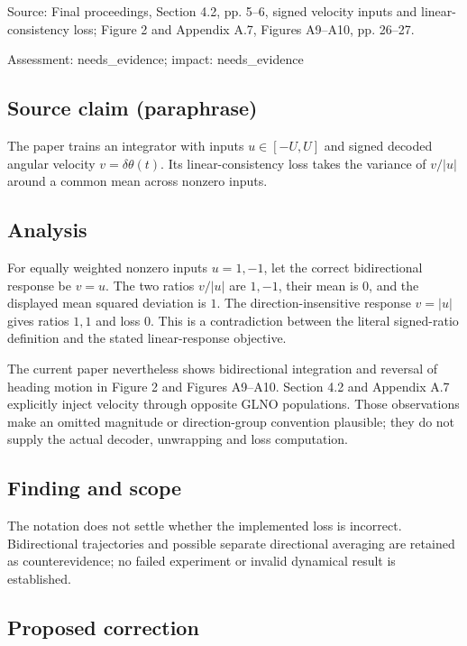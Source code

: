 \documentclass[11pt]{article}
\begin{document}
Source: Final proceedings, Section 4.2, pp. 5–6, signed velocity inputs and linear-consistency loss; Figure 2 and Appendix A.7, Figures A9–A10, pp. 26–27.

Assessment: needs\_evidence; impact: needs\_evidence

\subsection*{Source claim (paraphrase)}

The paper trains an integrator with inputs \(u\in[-U,U]\) and signed decoded angular velocity \(v=\delta\theta(t)\). Its linear-consistency loss takes the variance of \(v/|u|\) around a common mean across nonzero inputs.

\subsection*{Analysis}

For equally weighted nonzero inputs \(u=1,-1\), let the correct bidirectional response be \(v=u\). The two ratios \(v/|u|\) are \(1,-1\), their mean is \(0\), and the displayed mean squared deviation is \(1\). The direction-insensitive response \(v=|u|\) gives ratios \(1,1\) and loss \(0\). This is a contradiction between the literal signed-ratio definition and the stated linear-response objective.

The current paper nevertheless shows bidirectional integration and reversal of heading motion in Figure 2 and Figures A9–A10. Section 4.2 and Appendix A.7 explicitly inject velocity through opposite GLNO populations. Those observations make an omitted magnitude or direction-group convention plausible; they do not supply the actual decoder, unwrapping and loss computation.

\subsection*{Finding and scope}

The notation does not settle whether the implemented loss is incorrect. Bidirectional trajectories and possible separate directional averaging are retained as counterevidence; no failed experiment or invalid dynamical result is established.

\subsection*{Proposed correction}
\end{document}

